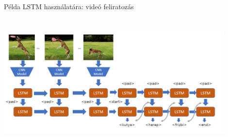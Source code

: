 \documentclass[english, aspectratio=169]{beamer}
\begin{document}
\begin{frame}{Példa LSTM használatára: videó feliratozás}
\begin{center}
\includegraphics[width=12cm, height=7cm, keepaspectratio]{images/recurrent_14.png}
\end{center}
\end{frame}
\end{document}
